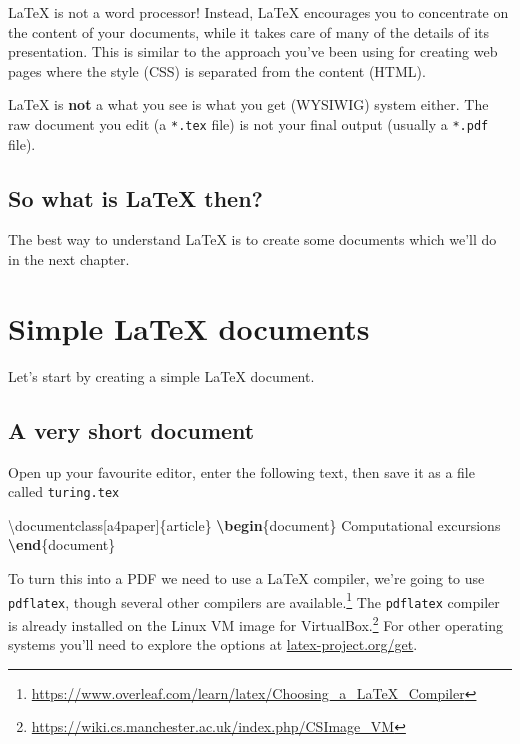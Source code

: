 \documentclass[
]{book}
\newenvironment{Shaded}{\begin{snugshade}}{\end{snugshade}}
\newcommand{\BuiltInTok}[1]{#1}
\newcommand{\ExtensionTok}[1]{#1}
\newcommand{\KeywordTok}[1]{\textcolor[rgb]{0.13,0.29,0.53}{\textbf{#1}}}
\newcommand{\NormalTok}[1]{#1}
\begin{document}
LaTeX is not a word processor! Instead, LaTeX encourages you to concentrate on the content of your documents, while it takes care of many of the details of its presentation. This is similar to the approach you've been using for creating web pages where the style (CSS) is separated from the content (HTML).

LaTeX is \textbf{not} a what you see is what you get (WYSIWIG) system either. The raw document you edit (a \texttt{*.tex} file) is not your final output (usually a \texttt{*.pdf} file).

\hypertarget{so-what-is-latex-then}{%
\section{So what is LaTeX then?}\label{so-what-is-latex-then}}

The best way to understand LaTeX is to create some documents which we'll do in the next chapter.

\hypertarget{simples}{%
\chapter{Simple LaTeX documents}\label{simples}}

Let's start by creating a simple LaTeX document.

\hypertarget{shortest}{%
\section{A very short document}\label{shortest}}

Open up your favourite editor, enter the following text, then save it as a file called \texttt{turing.tex}

\begin{Shaded}
\begin{Highlighting}[]
\BuiltInTok{\textbackslash{}documentclass}\NormalTok{[a4paper]\{}\ExtensionTok{article}\NormalTok{\}}
\KeywordTok{\textbackslash{}begin}\NormalTok{\{}\ExtensionTok{document}\NormalTok{\}}
\NormalTok{Computational excursions}
\KeywordTok{\textbackslash{}end}\NormalTok{\{}\ExtensionTok{document}\NormalTok{\}}
\end{Highlighting}
\end{Shaded}

To turn this into a PDF we need to use a LaTeX compiler, we're going to use \texttt{pdflatex}, though several other compilers are available.\footnote{\url{https://www.overleaf.com/learn/latex/Choosing_a_LaTeX_Compiler}} The \texttt{pdflatex} compiler is already installed on the Linux VM image for VirtualBox.\footnote{\url{https://wiki.cs.manchester.ac.uk/index.php/CSImage_VM}} For other operating systems you'll need to explore the options at \href{https://www.latex-project.org/get/}{latex-project.org/get}.
\end{document}
